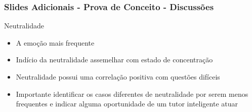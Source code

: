 \begin{frame}
\frametitle{Slides Adicionais - Prova de Conceito - Discussões}
\begin{block}{Neutralidade}
\begin{itemize}
\item A emo\c{c}\~ao mais frequente
\item Ind\'{i}cio da neutralidade assemelhar com estado de concentra\c{c}\~ao
\item Neutralidade possui uma correla\c{c}\~ao positiva com quest\~oes dif\'{i}ceis
\pause
\item Importante identificar os casos diferentes de neutralidade por serem menos frequentes 
e indicar alguma oportunidade de um tutor inteligente atuar
\end{itemize}
\end{block}

\end{frame}
 
